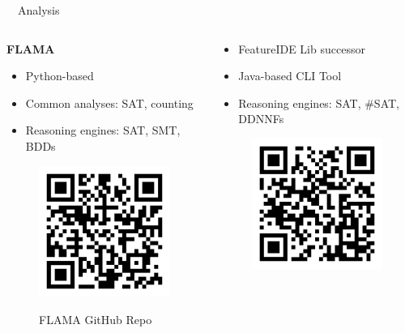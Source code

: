 \documentclass[
	aspectratio=169, %
	8pt, %
	nosectionframes, %
]{beamer}
\newcommand{\inlinesubtitle}[1]{\textcolor{gray!60}{~{}~#1}}
\begin{document}
\begin{frame}{\insertsection \inlinesubtitle{Analysis}}
    \vspace{0.4cm}
    \begin{columns}[t]
		\begin{column}{0.49\textwidth}
			\textbf{FLAMA}
            \begin{itemize}
                \item Python-based
                \item Common analyses: SAT, counting
                \item Reasoning engines: SAT, SMT, BDDs
            \end{itemize}
            \begin{figure}
                \centering
                \includegraphics[width=0.5\columnwidth]{pics/qr/flama.pdf}
                
                FLAMA GitHub Repo
            \end{figure}
		\end{column}%
		\begin{column}{0.49\textwidth}
            \begin{itemize}
    	        \item FeatureIDE Lib successor
                \item Java-based CLI Tool
                \item Reasoning engines: SAT, \#SAT, DDNNFs
            \end{itemize}
            \begin{figure}
                \centering
                \includegraphics[width=0.5\columnwidth]{pics/qr/featjar.pdf}
                

\end{figure}
\end{column}
\end{columns}
\end{frame}
\end{document}
